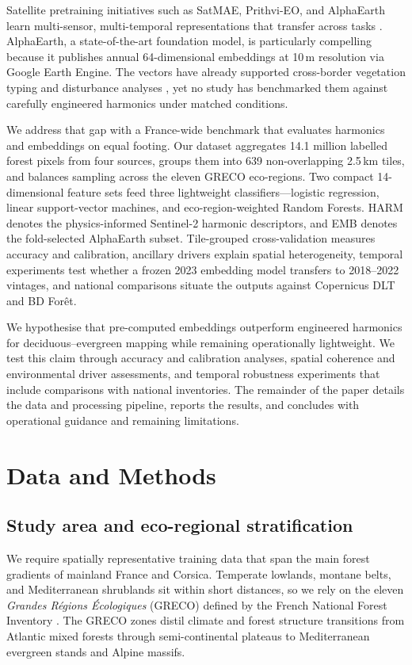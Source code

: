 \documentclass[utf8]{FrontiersinHarvard}
\begin{document}
Satellite pretraining initiatives such as SatMAE, Prithvi-EO, and AlphaEarth learn multi-sensor, multi-temporal representations that transfer across tasks \citep{Cong2022,Szwarcman2024PrithviEO2,AlphaEarth2025}. AlphaEarth, a state-of-the-art foundation model, is particularly compelling because it publishes annual 64-dimensional embeddings at 10\,m resolution via Google Earth Engine. The vectors have already supported cross-border vegetation typing and disturbance analyses \citep{Houriez2025AEFDataGen,Seydi2025AlphaEarthBurnedArea}, yet no study has benchmarked them against carefully engineered harmonics under matched conditions.

We address that gap with a France-wide benchmark that evaluates harmonics and embeddings on equal footing. Our dataset aggregates 14.1 million labelled forest pixels from four sources, groups them into 639 non-overlapping 2.5\,km tiles, and balances sampling across the eleven GRECO eco-regions. Two compact 14-dimensional feature sets feed three lightweight classifiers—logistic regression, linear support-vector machines, and eco-region-weighted Random Forests. HARM denotes the physics-informed Sentinel-2 harmonic descriptors, and EMB denotes the fold-selected AlphaEarth subset. Tile-grouped cross-validation measures accuracy and calibration, ancillary drivers explain spatial heterogeneity, temporal experiments test whether a frozen 2023 embedding model transfers to 2018–2022 vintages, and national comparisons situate the outputs against Copernicus DLT and BD Forêt.

We hypothesise that pre-computed embeddings outperform engineered harmonics for deciduous–evergreen mapping while remaining operationally lightweight. We test this claim through accuracy and calibration analyses, spatial coherence and environmental driver assessments, and temporal robustness experiments that include comparisons with national inventories. The remainder of the paper details the data and processing pipeline, reports the results, and concludes with operational guidance and remaining limitations.

\section{Data and Methods}

\subsection{Study area and eco-regional stratification}
\label{sec:greco}
We require spatially representative training data that span the main forest gradients of mainland France and Corsica. Temperate lowlands, montane belts, and Mediterranean shrublands sit within short distances, so we rely on the eleven \emph{Grandes Régions Écologiques} (GRECO) defined by the French National Forest Inventory \citep{IGN2013GRECO}. The GRECO zones distil climate and forest structure transitions from Atlantic mixed forests through semi-continental plateaus to Mediterranean evergreen stands and Alpine massifs.
\end{document}
